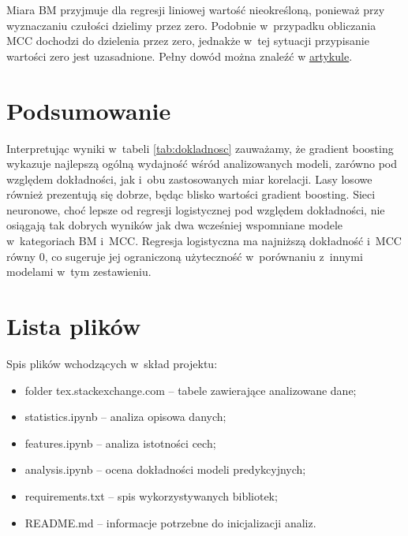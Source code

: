 \documentclass[12pt]{article}
\begin{document}
	Miara BM przyjmuje dla regresji liniowej wartość nieokreśloną, ponieważ przy wyznaczaniu czułości dzielimy przez zero.
	Podobnie w~przypadku obliczania MCC dochodzi do dzielenia przez zero, jednakże w~tej sytuacji przypisanie wartości zero jest uzasadnione.
	Pełny dowód można znaleźć w
	\underline{\href{https://biodatamining.biomedcentral.com/articles/10.1186/s13040-021-00244-z}{artykule}}.
	
	\section{Podsumowanie}
	Interpretując wyniki w~tabeli \ref{tab:dokladnosc} zauważamy, że   gradient boosting wykazuje najlepszą ogólną wydajność wśród analizowanych modeli, zarówno pod względem dokładności, jak i~obu zastosowanych miar korelacji. Lasy losowe również prezentują się dobrze, będąc blisko wartości gradient boosting. Sieci neuronowe, choć lepsze od regresji logistycznej pod względem dokładności, nie osiągają tak dobrych wyników jak dwa wcześniej wspomniane modele w~kategoriach BM i~MCC. Regresja logistyczna ma najniższą dokładność i~MCC równy $0$, co sugeruje jej ograniczoną użyteczność w~porównaniu z~innymi modelami w~tym zestawieniu.
	
	\section{Lista plików}\label{sec:lista-plikow}
	Spis plików wchodzących w~skład projektu:
	\begin{itemize}
		\item folder tex.stackexchange.com -- tabele zawierające analizowane dane;
		\item statistics.ipynb -- analiza opisowa danych;
		\item features.ipynb -- analiza istotności cech;
		\item analysis.ipynb -- ocena dokładności modeli predykcyjnych;
		\item requirements.txt -- spis wykorzystywanych bibliotek;
		\item README.md -- informacje potrzebne do inicjalizacji analiz.
	\end{itemize}
	
\end{document}
